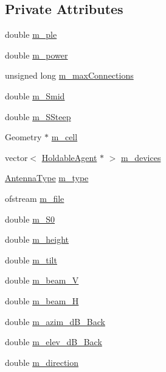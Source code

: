 \subsection*{Private Attributes}
\begin{DoxyCompactItemize}
\item 
double \hyperlink{class_antenna_a13b5973d4050a704682d65036acca851}{m\+\_\+ple}
\item 
double \hyperlink{class_antenna_a89874a2fbd083c99f780482bf4642b07}{m\+\_\+power}
\item 
unsigned long \hyperlink{class_antenna_a06480ddd6e9a9cb4d88c4cea72e2d2ab}{m\+\_\+max\+Connections}
\item 
double \hyperlink{class_antenna_ae5f536b16d9d924a7ee7cba954c44d05}{m\+\_\+\+Smid}
\item 
double \hyperlink{class_antenna_a48117d47d70c758f5a09c54fa323feed}{m\+\_\+\+S\+Steep}
\item 
Geometry $\ast$ \hyperlink{class_antenna_addbe8e6ae7a8bad737339d23bc2abbba}{m\+\_\+cell}
\item 
vector$<$ \hyperlink{class_holdable_agent}{Holdable\+Agent} $\ast$ $>$ \hyperlink{class_antenna_a2d0f7032eb1d8cc6c02b1dd64bc59856}{m\+\_\+devices}
\item 
\hyperlink{_antenna_type_8h_a7b678b5cb9dedc607131200119d96b16}{Antenna\+Type} \hyperlink{class_antenna_a6b68373c8b139e8dafc4c11480eee0e1}{m\+\_\+type}
\item 
ofstream \hyperlink{class_antenna_a06824840191e96b19eb224d53e08d3ec}{m\+\_\+file}
\item 
double \hyperlink{class_antenna_a65bdd3ec77862b9427df42ae74dc54e4}{m\+\_\+\+S0}
\item 
double \hyperlink{class_antenna_a0fca07a2514679c814009730d966b2a3}{m\+\_\+height}
\item 
double \hyperlink{class_antenna_a039d6c95ae3a5e9d4973f647783062de}{m\+\_\+tilt}
\item 
double \hyperlink{class_antenna_a330f54f4d7344094bf137cabf2756112}{m\+\_\+beam\+\_\+V}
\item 
double \hyperlink{class_antenna_a9174c6dd20682cea4eccea7c7d6ffee7}{m\+\_\+beam\+\_\+H}
\item 
double \hyperlink{class_antenna_aa7ed7c0424dfd20193b550a4ececcb64}{m\+\_\+azim\+\_\+d\+B\+\_\+\+Back}
\item 
double \hyperlink{class_antenna_a4bea419f24f40b37cfd784e61a01aec7}{m\+\_\+elev\+\_\+d\+B\+\_\+\+Back}
\item 
double \hyperlink{class_antenna_ac8984b2ecb6fd5f2e1eaef132f0175cb}{m\+\_\+direction}

\end{DoxyCompactItemize}
